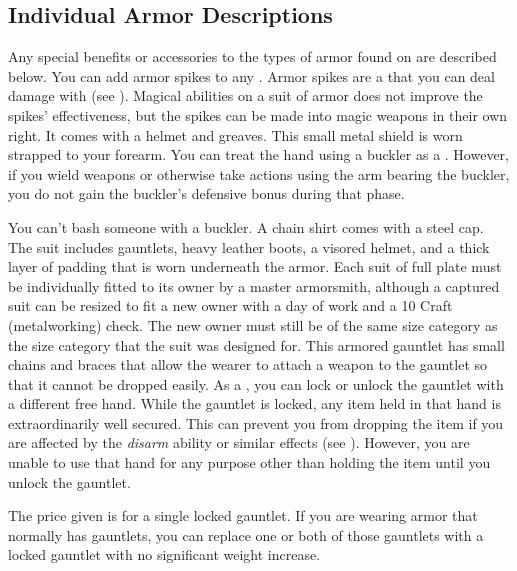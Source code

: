     \subsection{Individual Armor Descriptions}
        Any special benefits or accessories to the types of armor found on  are described below.
         You can add armor spikes to any .
        Armor spikes are a  that you can deal damage with (see ).
        Magical abilities on a suit of armor does not improve the spikes' effectiveness, but the spikes can be made into magic weapons in their own right.
         It comes with a helmet and greaves.
         This small metal shield is worn strapped to your forearm.
        You can treat the hand using a buckler as a .
        However, if you wield weapons or otherwise take actions using the arm bearing the buckler, you do not gain the buckler's defensive bonus during that phase.
        \par You can't bash someone with a buckler.
         A chain shirt comes with a steel cap.
         The suit includes gauntlets, heavy leather boots, a visored helmet, and a thick layer of padding that is worn underneath the armor. Each suit of full plate must be individually fitted to its owner by a master armorsmith, although a captured suit can be resized to fit a new owner with a day of work and a  10 Craft (metalworking) check. The new owner must still be of the same size category as the size category that the suit was designed for.
         This armored gauntlet has small chains and braces that allow the wearer to attach a weapon to the gauntlet so that it cannot be dropped easily.
        As a , you can lock or unlock the gauntlet with a different free hand.
        While the gauntlet is locked, any item held in that hand is extraordinarily well secured.
        This can prevent you from dropping the item if you are affected by the \textit{disarm} ability or similar effects (see ).
        However, you are unable to use that hand for any purpose other than holding the item until you unlock the gauntlet.
        \par The price given is for a single locked gauntlet.
        If you are wearing armor that normally has gauntlets, you can replace one or both of those gauntlets with a locked gauntlet with no significant weight increase.
